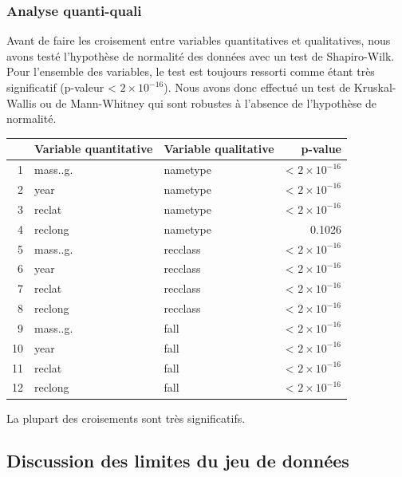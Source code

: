 \documentclass[12pt]{article}
\begin{document}
\subsubsection*{Analyse quanti-quali}
Avant de faire les croisement entre variables quantitatives et qualitatives, nous avons testé l'hypothèse de normalité des données avec un test de Shapiro-Wilk. Pour l'ensemble des variables, le test est toujours ressorti comme étant très significatif (p-valeur < $2\times 10^{-16}$). Nous avons donc effectué un test de Kruskal-Wallis ou de Mann-Whitney qui sont robustes à l'absence de l'hypothèse de normalité.
\begin{table}[H]
\centering
\begin{tabular}{rllr}
  \hline
 & Variable quantitative & Variable qualitative & p-value \\ 
  \hline
1 & mass..g. & nametype & < $2\times 10^{-16}$ \\ 
  2 & year & nametype &< $2\times 10^{-16}$  \\ 
  3 & reclat & nametype &< $2\times 10^{-16}$ \\ 
  4 & reclong & nametype & 0.1026 \\ 
  5 & mass..g. & recclass & < $2\times 10^{-16}$  \\ 
  6 & year & recclass & < $2\times 10^{-16}$  \\ 
  7 & reclat & recclass & < $2\times 10^{-16}$  \\ 
  8 & reclong & recclass & < $2\times 10^{-16}$  \\ 
  9 & mass..g. & fall &< $2\times 10^{-16}$  \\ 
  10 & year & fall & < $2\times 10^{-16}$  \\ 
  11 & reclat & fall &< $2\times 10^{-16}$  \\ 
  12 & reclong & fall &< $2\times 10^{-16}$  \\ 
   \hline
\end{tabular}
\end{table}
La plupart des croisements sont très significatifs.
\subsection{Discussion des limites du jeu de données}
\end{document}
